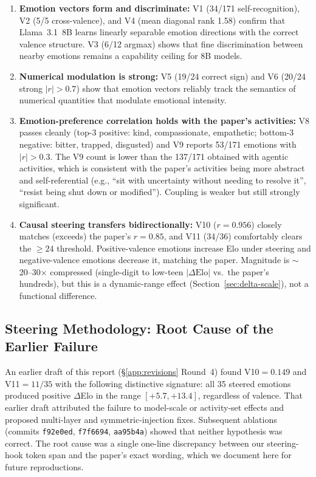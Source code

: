 \documentclass[11pt,a4paper]{article}
\begin{document}
\begin{enumerate}
  \item \textbf{Emotion vectors form and discriminate:}
    V1 (34/171 self-recognition), V2 (5/5 cross-valence), and V4
    (mean diagonal rank 1.58) confirm that Llama~3.1~8B learns
    linearly separable emotion directions with the correct valence
    structure.  V3 (6/12 argmax) shows that fine discrimination
    between nearby emotions remains a capability ceiling for 8B
    models.

  \item \textbf{Numerical modulation is strong:}
    V5 (19/24 correct sign) and V6 (20/24 strong $|r|{>}0.7$) show
    that emotion vectors reliably track the semantics of numerical
    quantities that modulate emotional intensity.

  \item \textbf{Emotion-preference correlation holds with the paper's
    activities:}
    V8 passes cleanly (top-3 positive: kind, compassionate,
    empathetic; bottom-3 negative: bitter, trapped, disgusted) and
    V9 reports 53/171 emotions with $|r|{>}0.3$.  The V9 count is
    lower than the 137/171 obtained with agentic activities, which
    is consistent with the paper's activities being more abstract
    and self-referential (e.g., ``sit with uncertainty without
    needing to resolve it'', ``resist being shut down or
    modified'').  Coupling is weaker but still strongly significant.

  \item \textbf{Causal steering transfers bidirectionally:}
    V10 ($r{=}0.956$) closely matches (exceeds) the paper's
    $r{=}0.85$, and V11 (34/36) comfortably clears the $\geq 24$
    threshold.  Positive-valence emotions increase Elo under
    steering and negative-valence emotions decrease it, matching
    the paper.  Magnitude is $\sim$20--30$\times$ compressed
    (single-digit to low-teen $|\Delta\text{Elo}|$ vs.\ the paper's
    hundreds), but this is a dynamic-range effect
    (Section~\ref{sec:delta-scale}), not a functional difference.
\end{enumerate}

\subsection{Steering Methodology: Root Cause of the Earlier Failure}
\label{sec:steering-analysis}

An earlier draft of this report (\S\ref{app:revisions} Round~4) found
V10$=0.149$ and V11$=11/35$ with the following distinctive signature:
all 35 steered emotions produced positive $\Delta$Elo in the range
$[+5.7, +13.4]$, regardless of valence.  That earlier draft attributed
the failure to model-scale or activity-set effects and proposed
multi-layer and symmetric-injection fixes.  Subsequent ablations
(commits \texttt{f92e0ed}, \texttt{f7f6694}, \texttt{aa95b4a}) showed
that neither hypothesis was correct.  The root cause was a single
one-line discrepancy between our steering-hook token span and the
paper's exact wording, which we document here for future
reproductions.
\end{document}
